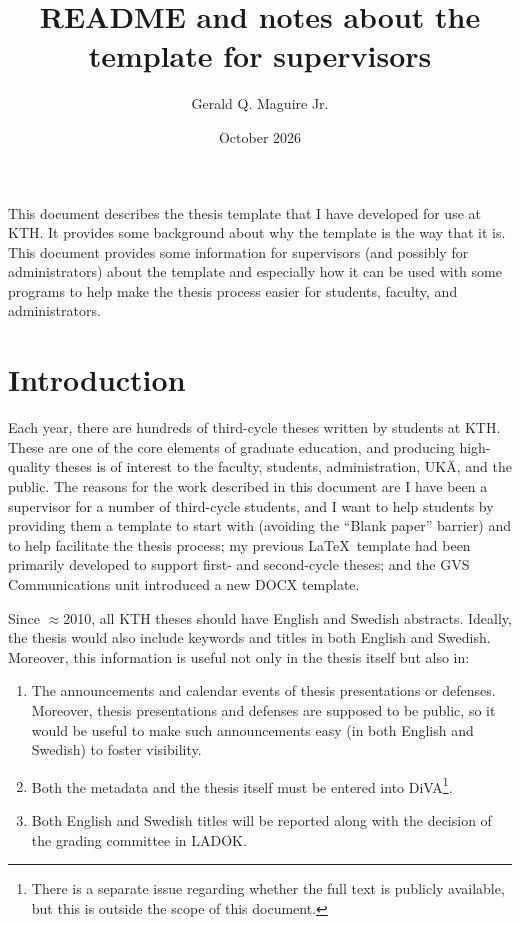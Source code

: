 \documentclass[12pt, twoside]{article}
\title{README and notes about the template for supervisors}
\author{Gerald Q. Maguire Jr.}
\date{October 2026}
\begin{document}
\glsresetall[]
\maketitle
{}


This document describes the thesis template that I have developed for use at \gls{KTH}. It provides some background about why the template is the way that it is. This document provides some information for supervisors (and possibly for administrators) about the template and especially how it can be used with some programs to help make the thesis process easier for students, faculty, and administrators.

\setcounter{page}{1}
\glsresetall
\section{Introduction}
\label{sec:IntroForSupervisors}

Each year, there are hundreds of third-cycle theses written by students at \gls{KTH}. These are one of the core elements of graduate education, and producing high-quality theses is of interest to the faculty, students, administration, \foreignlanguage{swedish}{\gls{UKÄ}}, and the public. The reasons for the work described in this document are \first I have been a supervisor for a number of third-cycle students, and I want to help students by providing them a template to start with (avoiding the \enquote{Blank paper} barrier) and to help facilitate the thesis process; \Second my previous \LaTeX~template had been primarily developed to support first- and second-cycle theses; and \third the \foreignlanguage{swedish}{\gls{GVS}} Communications unit introduced a new DOCX template.

Since $\approx$2010, all KTH theses should have English and Swedish abstracts. Ideally, the thesis would also include keywords and titles in both English and Swedish. Moreover, this information is useful not only in the thesis itself but also in:
\begin{enumerate}
    \item The announcements and calendar events of thesis presentations or defenses. Moreover, thesis presentations and defenses are supposed to be public, so it would be useful to make such announcements easy (in both English and Swedish) to foster visibility.
    \item Both the metadata and the thesis itself must be entered into \gls{DiVA}\footnote{There is a separate issue regarding whether the full text is publicly available, but this is outside the scope of this document.}.
    \item Both English and Swedish titles will be reported along with the decision of the grading committee in \gls{LADOK}.
\end{enumerate}
\end{document}
